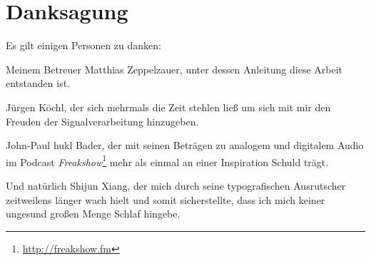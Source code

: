 \chapter*{Danksagung}

Es gilt einigen Personen zu danken:

Meinem Betreuer Matthias Zeppelzauer, unter dessen Anleitung diese Arbeit entstanden ist.

J\"urgen K\"ochl, der sich mehrmals die Zeit stehlen lie{\ss} um sich mit mir den Freuden der Signalverarbeitung hinzugeben.

John-Paul \glqq hukl\grqq{} Bader, der mit seinen Betr\"agen zu analogem und digitalem Audio im Podcast \emph{Freakshow}\footnote{\url{http://freakshow.fm}} mehr als einmal an einer Inspiration Schuld tr\"agt. 

Und natürlich Shijun Xiang, der mich durch seine typografischen Ausrutscher zeitweilens l\"anger wach hielt und somit sicherstellte, dass ich mich keiner ungesund gro{\ss}en Menge Schlaf hingebe. 
